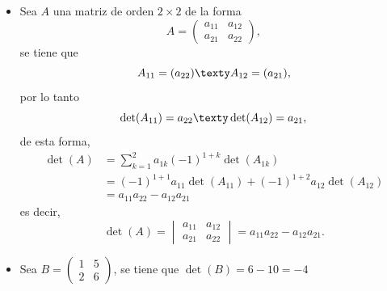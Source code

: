 \documentclass[compacto,10pt]{pubciencias-notas}
\begin{document}
\begin{ejem}\hspace{0pt} \label{determinante3por3}

\begin{itemize}
\item 
    Sea $A$ una matriz de orden $2 \times 2$ de la forma
    \[ 
        A=
        \begin{pmatrix}
         a_{11} & a_{12}\\
         a_{21} & a_{22}
        \end{pmatrix},
    \]
    se tiene que
    \[
        A_{11} = (a_{22})
        \texty
        A_{12} = (a_{21}),
    \]
    por lo tanto
    \[
        \det(A_{11}) = a_{22}
        \texty
        \det(A_{12}) = a_{21},
    \]
    de esta forma,
    \begin{align*}
        \det(A) &= \sum_{k=1}^{2} a_{1k}(-1)^{1+k}\det(A_{1k})\\
        &= (-1)^{1+1}a_{11}\det(A_{11}) + (-1)^{1+2}a_{12}\det(A_{12})\\
        & = a_{11}a_{22} - a_{12}a_{21}
    \end{align*}
    es decir,
    \[
        \det(A) = \begin{vmatrix}
        a_{11} & a_{12} \\
        a_{21} & a_{22}
        \end{vmatrix}
        = a_{11}a_{22} - a_{12}a_{21}.
    \]
    
\item Sea $B = \begin{pmatrix}
        1 & 5 \\
        2 & 6
    \end{pmatrix}$, se tiene que $\det(B) = 6-10 = -4$


\end{itemize}
\end{ejem}
\end{document}
